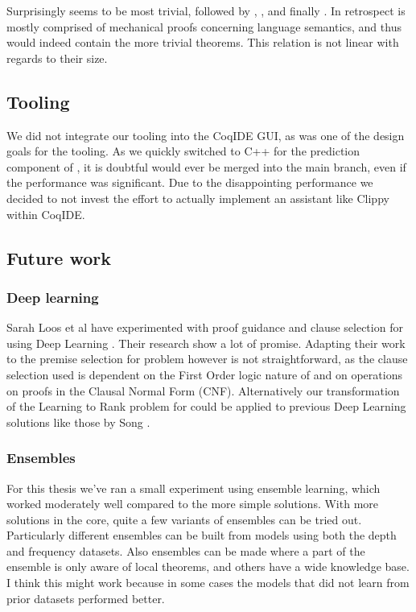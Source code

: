 Surprisingly \formalin seems to be most trivial, followed by \coq, \mathclasses, \corn and finally \mathcomp.
In retrospect \formalin is mostly comprised of mechanical proofs concerning language semantics, and thus would indeed contain the more trivial theorems.
This relation is not linear with regards to their size.

\subsection{Tooling}
We did not integrate our tooling into the CoqIDE GUI, as was one of the design goals for the \roerei tooling.
As we quickly switched to C++ for the prediction component of \roerei, it is doubtful \roerei would ever be merged into the \coq main branch,
even if the performance was significant.
Due to the disappointing performance we decided to not invest the effort to actually implement an assistant like Clippy within CoqIDE.

\subsection{Future work}
\subsubsection{Deep learning}
Sarah Loos et al have experimented with proof guidance and clause selection for \mizar using Deep Learning \cite{loos2017deep}.
Their research show a lot of promise.
Adapting their work to the premise selection for \coq problem however is not straightforward, as the clause selection used is
dependent on the First Order logic nature of \mizar and on operations on proofs in the Clausal Normal Form (CNF).
Alternatively our transformation of the Learning to Rank problem for \adarank could be applied to previous Deep Learning solutions like
those by Song \cite{song2018deep}.

\subsubsection{Ensembles}
For this thesis we've ran a small experiment using ensemble learning, which worked moderately well compared to
the more simple solutions.
With more solutions in the core, quite a few variants of ensembles can be tried out.
Particularly different ensembles can be built from models using both the depth and frequency datasets.
Also ensembles can be made where a part of the ensemble is only aware of local theorems, and others have a wide knowledge base.
I think this might work because in some cases the models that did not learn from prior datasets performed better.

